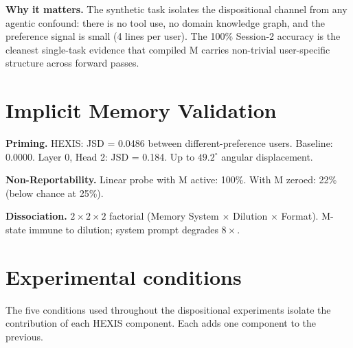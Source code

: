 \textbf{Why it matters.} The synthetic task isolates the dispositional channel from any agentic confound: there is no tool use, no domain knowledge graph, and the preference signal is small (4 lines per user). The 100\% Session-2 accuracy is the cleanest single-task evidence that compiled M carries non-trivial user-specific structure across forward passes.

\section{Implicit Memory Validation}
\label{sec:implicit_validation}

\textbf{Priming.} HEXIS: JSD = 0.0486 between different-preference users. Baseline: 0.0000. Layer 0, Head 2: JSD = 0.184. Up to $49.2^\circ$ angular displacement.

\textbf{Non-Reportability.} Linear probe with M active: 100\%. With M zeroed: 22\% (below chance at 25\%).

\textbf{Dissociation.} $2 \times 2 \times 2$ factorial (Memory System $\times$ Dilution $\times$ Format). M-state immune to dilution; system prompt degrades $8\times$.



\section{Experimental conditions}
\label{sec:conditions_appendix}

The five conditions used throughout the dispositional experiments isolate the contribution of each HEXIS component. Each adds one component to the previous.

